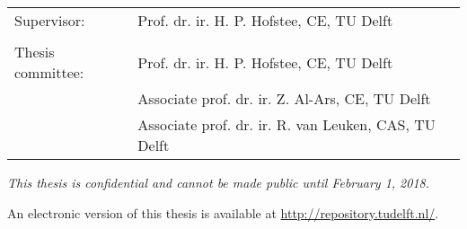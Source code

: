 \begin{titlingpage}
\begin{center}
\vfill

\begin{tabular}{lll}
    Supervisor: & Prof. dr. ir. H. P. Hofstee, CE, TU Delft\\
                \\
    Thesis committee:
        & Prof. dr. ir. H. P. Hofstee, CE, TU Delft\\
        & Associate prof. dr. ir. Z. Al-Ars, CE, TU Delft\\
        & Associate prof. dr. ir. R. van Leuken, CAS, TU Delft\\
\end{tabular}

\bigskip
\bigskip
\emph{This thesis is confidential and cannot be made public until February 1, 2018.}

\bigskip
\bigskip
An electronic version of this thesis is available at \url{http://repository.tudelft.nl/}.

\end{center}

\end{titlingpage}
